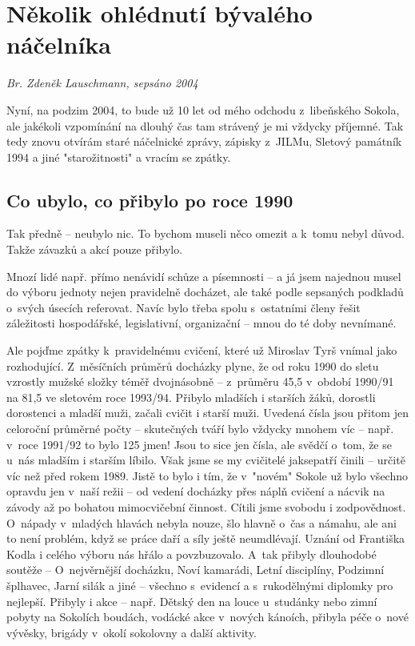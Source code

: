\documentclass[a5paper, 11pt, twoside]{article}
\begin{document}
\section{Několik ohlédnutí bývalého
náčelníka}
\begin{center}
  \textit{Br. Zdeněk Lauschmann, sepsáno 2004}
\end{center}

\noindent
Nyní, na podzim 2004, to bude už 10 let od mého odchodu z~libeňského
Sokola, ale jakékoli vzpomínání na dlouhý čas tam strávený je mi vždycky
příjemné. Tak tedy znovu otvírám staré náčelnické zprávy, zápisky
z~JILMu, Sletový památník 1994 a jiné "starožitnosti" a vracím se zpátky.

\subsection{Co ubylo, co přibylo po roce
1990}

Tak předně -- neubylo nic. To bychom museli něco omezit a k~tomu nebyl
důvod. Takže závazků a akcí pouze přibylo.

Mnozí lidé např. přímo nenávidí schůze a písemnosti -- a já jsem
najednou musel do výboru jednoty nejen pravidelně docházet, ale také
podle sepsaných podkladů o~svých úsecích referovat. Navíc bylo třeba
spolu s~ostatními členy řešit záležitosti hospodářské, legislativní,
organizační -- mnou do té doby nevnímané.

Ale pojďme zpátky k~pravidelnému cvičení, které už Miroslav Tyrš vnímal
jako rozhodující. Z~měsíčních průměrů docházky plyne, že od roku 1990 do
sletu vzrostly mužské složky téměř dvojnásobně -- z~průměru 45,5
v~období 1990/91 na 81,5 ve sletovém roce 1993/94. Přibylo mladších i
starších žáků, dorostli dorostenci a mladší muži, začali cvičit i starší
muži. Uvedená čísla jsou přitom jen celoroční průměrné počty --
skutečných tváří bylo vždycky mnohem víc -- např. v~roce 1991/92 to bylo
125 jmen! Jsou to sice jen čísla, ale svědčí o~tom, že se u~nás mladším
i starším líbilo. Však jsme se my cvičitelé jaksepatří činili -- určitě
víc než před rokem 1989. Jistě to bylo i tím, že v~"novém" Sokole už
bylo všechno opravdu jen v~naší režii -- od vedení docházky přes náplň
cvičení a nácvik na závody až po bohatou mimocvičební činnost. Cítili
jsme svobodu i zodpovědnost. O~nápady v~mladých hlavách nebyla nouze,
šlo hlavně o~čas a námahu, ale ani to není problém, když se práce daří a
síly ještě neumdlévají. Uznání od Františka Kodla i celého výboru nás
hřálo a povzbuzovalo. A~tak přibyly dlouhodobé soutěže -- O~nejvěrnější
docházku, Noví kamarádi, Letní disciplíny, Podzimní šplhavec, Jarní
silák a jiné -- všechno s~evidencí a s~rukodělnými diplomky pro
nejlepší. Přibyly i akce -- např. Dětský den na louce u~studánky nebo
zimní pobyty na Sokolích boudách, vodácké akce v~nových kánoích, přibyla
péče o~nové vývěsky, brigády v~okolí sokolovny a další aktivity.
\end{document}
